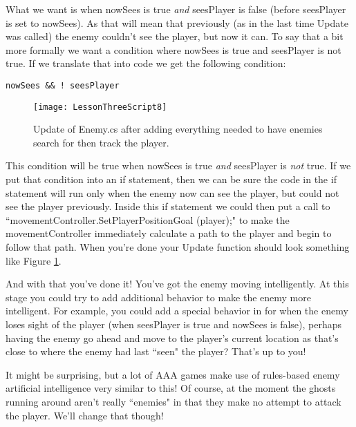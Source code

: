 \documentclass{article}
\begin{document}
What we want is when nowSees is true \textit{and} seesPlayer is false (before seesPlayer is set to nowSees). As that will mean that previously (as in the last time Update was called) the enemy couldn't see the player, but now it can. To say that a bit more formally we want a condition where nowSees is true and seesPlayer is not true. If we translate that into code we get the following condition:

\lstset{style=sharpc}
\begin{lstlisting}
nowSees && ! seesPlayer
\end{lstlisting} 

\begin{figure}
  \texttt{[image: LessonThreeScript8]}
  \caption{Update of Enemy.cs after adding everything needed to have enemies search for then track the player.}
  \label{fig:LessonThreeScript8}
\end{figure}

This condition will be true when nowSees is true \textit{and} seesPlayer is \textit{not} true. If we put that condition into an if statement, then we can be sure the code in the if statement will run only when the enemy now can see the player, but could not see the player previously. Inside this if statement we could then put a call to ``movementController.SetPlayerPositionGoal (player);" to make the movementController immediately calculate a path to the player and begin to follow that path. When you're done your Update function should look something like Figure \ref{fig:LessonThreeScript8}. 

\noindent{}

And with that you've done it! You've got the enemy moving intelligently. At this stage you could try to add additional behavior to make the enemy more intelligent. For example, you could add a special behavior in for when the enemy loses sight of the player (when seesPlayer is true and nowSees is false), perhaps having the enemy go ahead and move to the player's current location as that's close to where the enemy had last ``seen" the player? That's up to you!

It might be surprising, but a lot of AAA games make use of rules-based enemy artificial intelligence very similar to this! Of course, at the moment the ghosts running around aren't really ``enemies" in that they make no attempt to attack the player. We'll change that though!
\end{document}
